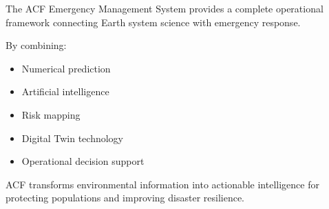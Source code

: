 The ACF Emergency Management System provides a complete operational
framework connecting Earth system science with emergency response.

By combining:

\begin{itemize}

\item Numerical prediction

\item Artificial intelligence

\item Risk mapping

\item Digital Twin technology

\item Operational decision support

\end{itemize}


ACF transforms environmental information into actionable intelligence
for protecting populations and improving disaster resilience.



